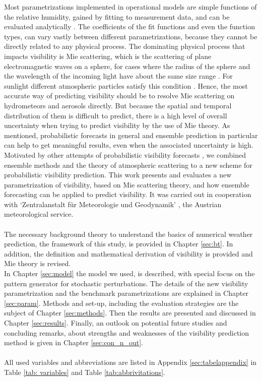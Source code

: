 Most parametrizations implemented in operational models are simple functions of the relative humidity, gained by fitting to measurement data, and can be evaluated analytically  \cite{gultepe2010probabilistic}.
The coefficients of the fit functions and even the function types, can vary vastly between different parametrizations, because they cannot be directly related to any physical process.
The dominating physical process that impacts visibility is Mie scattering, which is the scattering of plane electromagnetic waves on a sphere, for cases where the radius of the sphere and the wavelength of the incoming light have about the same size range \parencite{mie1908beitrage}. For sunlight different atmospheric particles satisfy this condition \parencite{wallace2006atmospheric}. Hence, the most accurate way of predicting visibility should be to resolve Mie scattering on hydrometeors and aerosols directly.
But because the spatial and temporal distribution of them is difficult to predict, there is a high level of overall uncertainty when trying to predict visibility by the use of Mie theory. As mentioned, probabilistic forecasts in general and ensemble prediction in particular can help to get meaningful results, even when the associated uncertainty is high.
Motivated by other attempts of probabilistic visibility forecasts \cite{chmielecki2011probabilistic, Roquelaure}, we combined ensemble methods and the theory of atmospheric scattering to a new scheme for probabilistic visibility prediction. 
This work presents and evaluates a new parametrization of visibility, based on Mie scattering theory, and how ensemble forecasting can be applied to predict visibility. It was carried out in cooperation with `Zentralanstalt für Meteorologie und Geodynamik' \cite{zamg}, the Austrian meteorological service.\\ \\
The necessary background theory to understand the basics of numerical weather prediction, the framework of this study, is provided in Chapter \ref{sec:bt}. In addition, the definition and mathematical derivation of visibility is provided and Mie theory is revised.\\
In Chapter \ref{sec:model} the model we used, is described, with special focus on the pattern generator for stochastic perturbations. The details of the new visibility parametrization and the benchmark  parametrizations are explained in Chapter \ref{sec:param}. Methods and set-up, including the evaluation strategies are the subject of Chapter \ref{sec:methods}. Then the results are presented and discussed in Chapter \ref{sec:results}. Finally, an outlook on potential future studies and concluding remarks, about strengths and weaknesses of the visibility prediction method is given in Chapter \ref{sec:con_n_out}.\\
\\
All used variables and abbreviations are listed in Appendix \ref{sec:tabelappendix} in Table \ref{tab: variables} and Table \ref{tab:abbrivitations}.



